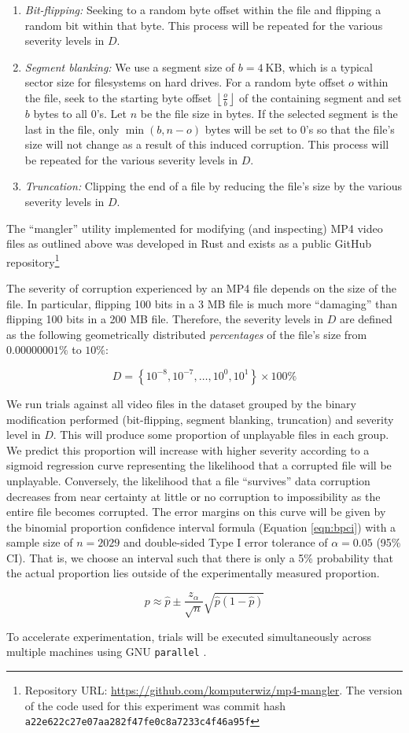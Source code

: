 \begin{enumerate}
    \item \emph{Bit-flipping:} Seeking to a random byte offset within the file and flipping a random bit within that byte. This process will be repeated for the various severity levels in \( D \).
    \item \emph{Segment blanking:} We use a segment size of \( b = 4\ \text{KB} \), which is a typical sector size for filesystems on hard drives. For a random byte offset \( o \) within the file, seek to the starting byte offset \( \left\lfloor \frac{o}{b} \right\rfloor \) of the containing segment and set \( b \) bytes to all 0's. Let \( n \) be the file size in bytes. If the selected segment is the last in the file, only \( \min \left( b, n - o \right) \) bytes will be set to 0's so that the file's size will not change as a result of this induced corruption. This process will be repeated for the various severity levels in \( D \).
    \item \emph{Truncation:} Clipping the end of a file by reducing the file's size by the various severity levels in \( D \).
\end{enumerate}

The ``mangler'' utility implemented for modifying (and inspecting) MP4 video files as outlined above was developed in Rust and exists as a public GitHub repository\footnote{Repository URL: \url{https://github.com/komputerwiz/mp4-mangler}. The version of the code used for this experiment was commit hash \texttt{a22e622c27e07aa282f47fe0c8a7233c4f46a95f}}

The severity of corruption experienced by an MP4 file depends on the size of the file. In particular, flipping 100 bits in a 3 MB file is much more ``damaging'' than flipping 100 bits in a 200 MB file. Therefore, the severity levels in \( D \) are defined as the following geometrically distributed \emph{percentages} of the file's size from \( 0.00000001\% \) to \( 10\% \):

\[ D = \left\{ 10^{-8}, 10^{-7}, \ldots, 10^0, 10^1 \right\} \times 100\% \]

We run trials against all video files in the dataset grouped by the binary modification performed (bit-flipping, segment blanking, truncation) and severity level in \( D \). This will produce some proportion of unplayable files in each group. We predict this proportion will increase with higher severity according to a sigmoid regression curve representing the likelihood that a corrupted file will be unplayable. Conversely, the likelihood that a file ``survives'' data corruption decreases from near certainty at little or no corruption to impossibility as the entire file becomes corrupted. The error margins on this curve will be given by the binomial proportion confidence interval formula (Equation \ref{eqn:bpci}) with a sample size of \( n = 2029 \) and double-sided Type I error tolerance of \( \alpha = 0.05 \) (95\% CI). That is, we choose an interval such that there is only a 5\% probability that the actual proportion lies outside of the experimentally measured proportion.

\begin{equation}
    p \approx \hat{p} \pm \frac{z_\alpha}{\sqrt{n}} \sqrt{\hat{p} \left( 1 - \hat{p} \right)}
    \label{eqn:bpci}
\end{equation}

To accelerate experimentation, trials will be executed simultaneously across multiple machines using GNU \texttt{parallel} \cite{gparallel}.